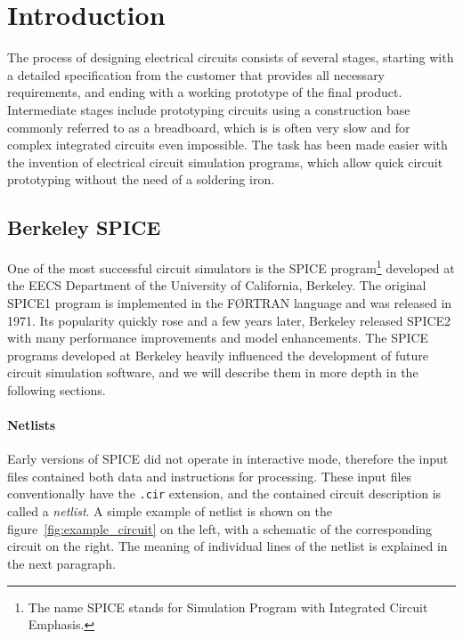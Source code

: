 
\chapter{Introduction}

The process of designing electrical circuits consists of several stages, starting with a detailed specification from the customer that provides all necessary requirements, and ending with a working prototype of the final product. Intermediate stages include prototyping circuits using a construction base commonly referred to as a breadboard, which is is often very slow and for complex integrated circuits even impossible. The task has been made easier with the invention of electrical circuit simulation programs, which allow quick circuit prototyping without the need of a soldering iron.

\section{Berkeley SPICE}
One of the most successful circuit simulators is the SPICE program\footnote{The name SPICE stands for Simulation Program with Integrated Circuit Emphasis.} developed at the EECS Department of the University of California, Berkeley. The original SPICE1 program is implemented in the FØRTRAN language and was released in 1971. Its popularity quickly rose and a few years later, Berkeley released SPICE2 with many performance improvements and model enhancements. The SPICE programs developed at Berkeley heavily influenced the development of future circuit simulation software, and we will describe them in more depth in the following sections.

\subsubsection*{Netlists}
Early versions of SPICE did not operate in interactive mode, therefore the input files contained both data and instructions for processing. These input files conventionally have the \texttt{.cir} extension, and the contained circuit description is called a \textit{netlist}. A simple example of netlist is shown on the figure~\ref{fig:example_circuit} on the left, with a schematic of the corresponding circuit on the right. The meaning of individual lines of the netlist is explained in the next paragraph.

